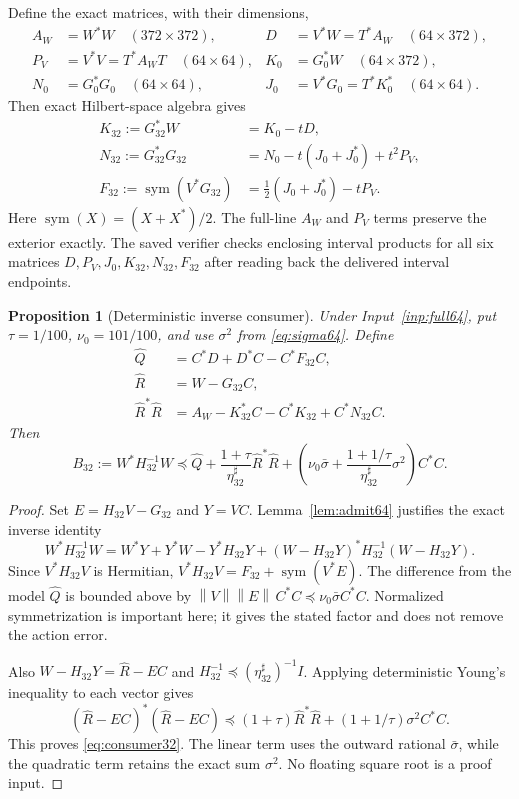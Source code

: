 \documentclass[11pt,a4paper]{article}
\numberwithin{equation}{section}
\newtheorem{proposition}[theorem]{Proposition}
\theoremstyle{definition}\newtheorem{definition}[theorem]{Definition}
\theoremstyle{remark}\newtheorem{remark}[theorem]{Remark}
\newcommand{\norm}[1]{\left\|#1\right\|}
\begin{document}
Define the exact matrices, with their dimensions,
\begin{align}\label{eq:affinebase}
 A_W&=W^*W\quad(372\times372),&
 D&=V^*W=T^*A_W\quad(64\times372),\nonumber\\
 P_V&=V^*V=T^*A_WT\quad(64\times64),&
 K_0&=G_0^*W\quad(64\times372),\\
 N_0&=G_0^*G_0\quad(64\times64),&
 J_0&=V^*G_0=T^*K_0^*\quad(64\times64).\nonumber
\end{align}
Then exact Hilbert-space algebra gives
\begin{align}\label{eq:affinegrams}
 K_{32}:=G_{32}^*W&=K_0-tD,\nonumber\\
 N_{32}:=G_{32}^*G_{32}&=N_0-t(J_0+J_0^*)+t^2P_V,\\
 F_{32}:=\operatorname{sym}(V^*G_{32})
 &=\tfrac12(J_0+J_0^*)-tP_V.\nonumber
\end{align}
Here $\operatorname{sym}(X)=(X+X^*)/2$. The full-line $A_W$ and $P_V$ terms preserve the exterior exactly. The saved verifier checks enclosing interval products for all six matrices $D,P_V,J_0,K_{32},N_{32},F_{32}$ after reading back the delivered interval endpoints.

\begin{proposition}[Deterministic inverse consumer]\label{prop:consumer32}
Under Input~\ref{inp:full64}, put $\tau=1/100$, $\nu_0=101/100$, and use $\sigma^2$ from \eqref{eq:sigma64}. Define
\begin{align}\label{eq:QandR32}
 \widehat Q&=C^*D+D^*C-C^*F_{32}C,\nonumber\\
 \widehat R&=W-G_{32}C,\\
 \widehat R^*\widehat R&=A_W-K_{32}^*C-C^*K_{32}+C^*N_{32}C.\nonumber
\end{align}
Then
\begin{equation}\label{eq:consumer32}
 B_{32}:=W^*H_{32}^{-1}W\preceq
 \widehat Q+\frac{1+\tau}{\eta_{32}^{\sharp}}\widehat R^*\widehat R
 +\left(\nu_0\bar\sigma+
 \frac{1+1/\tau}{\eta_{32}^{\sharp}}\sigma^2\right)C^*C.
\end{equation}
\end{proposition}
\begin{proof}
Set $E=H_{32}V-G_{32}$ and $Y=VC$. Lemma~\ref{lem:admit64} justifies the exact inverse identity
\[
 W^*H_{32}^{-1}W=W^*Y+Y^*W-Y^*H_{32}Y
 +(W-H_{32}Y)^*H_{32}^{-1}(W-H_{32}Y).
\]
Since $V^*H_{32}V$ is Hermitian,
$V^*H_{32}V=F_{32}+\operatorname{sym}(V^*E)$.
The difference from the model $\widehat Q$ is bounded above by
$\norm V\norm E\,C^*C\preceq\nu_0\bar\sigma C^*C$.
Normalized symmetrization is important here; it gives the stated factor and does not remove the action error.

Also $W-H_{32}Y=\widehat R-EC$ and $H_{32}^{-1}\preceq(\eta_{32}^{\sharp})^{-1}I$. Applying deterministic Young's inequality to each vector gives
\[
 (\widehat R-EC)^*(\widehat R-EC)
 \preceq(1+\tau)\widehat R^*\widehat R
 +(1+1/\tau)\sigma^2 C^*C.
\]
This proves \eqref{eq:consumer32}. The linear term uses the outward rational $\bar\sigma$, while the quadratic term retains the exact sum $\sigma^2$. No floating square root is a proof input.
\end{proof}
\end{document}
